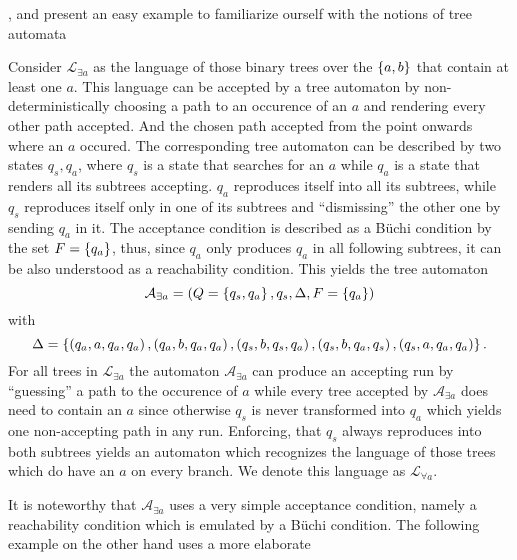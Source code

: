      , and present an easy example 
to familiarize ourself with the notions of tree automata
\begin{example}
  Consider $\mathcal{L}_{\exists a}$ as the language of those binary trees over 
  the $\left\{a,b\right\}$ that contain at least one $a$. This language can be accepted 
  by a tree automaton by non-deterministically choosing a path to an occurence 
  of an $a$ and rendering every other path accepted. And the chosen path 
  accepted from the point onwards where an $a$ occured. The corresponding tree 
  automaton can be described by two states $q_{s}, q_{a}$, where $q_{s}$ is a 
  state that searches for an $a$ while $q_{a}$ is a state that renders all its 
  subtrees accepting. $q_{a}$ reproduces itself into all its subtrees, while 
  $q_{s}$ reproduces itself only in one of its subtrees and 
  \enquote{dismissing} the other one by sending $q_{a}$ in it. The acceptance 
  condition is described as a Büchi condition by the set $F = \left\{q_{a}\right\}$, 
  thus, since $q_{a}$ only produces $q_{a}$ in all following subtrees, it can 
  be also understood as a reachability condition. This yields the tree 
  automaton
  \begin{equation*}
    \mathcal{A}_{\exists a} = \left(Q = \left\{q_{s}, q_{a}\right\}, q_{s},
    \Delta ,F = \left\{q_{a}\right\}\right)
  \end{equation*}
  with
  \begin{equation*}
    \Delta = \left\{\left(q_{a}, a, q_{a}, q_{a}\right),\left(q_{a}, b, q_{a}, q_{a}\right),
      \left(q_{s}, b, q_{s}, q_{a}\right), \left(q_{s}, b, q_{a}, q_{s}\right),
      \left(q_{s}, a, q_{a}, q_{a}\right)\right\}.
  \end{equation*}
  For all trees in $\mathcal{L}_{\exists a}$ the automaton
  $\mathcal{A}_{\exists a}$ can produce an accepting run by \enquote{guessing}
  a path to the occurence of $a$ while every tree accepted by
  $\mathcal{A}_{\exists a}$ does need to contain an $a$ since otherwise $q_{s}$
  is never transformed into $q_{a}$ which yields one non-accepting path in any
  run. Enforcing, that $q_{s}$ always reproduces into both subtrees yields an
  automaton which recognizes the language of those trees which do have an $a$
  on every branch. We denote this language as $\mathcal{L}_{\forall a}$.
  \label{ex:treeexa}
\end{example}
It is noteworthy that $\mathcal{A}_{\exists a}$ uses a very simple acceptance
condition, namely a reachability condition which is emulated by a Büchi
condition. The following example on the other hand uses a more elaborate
